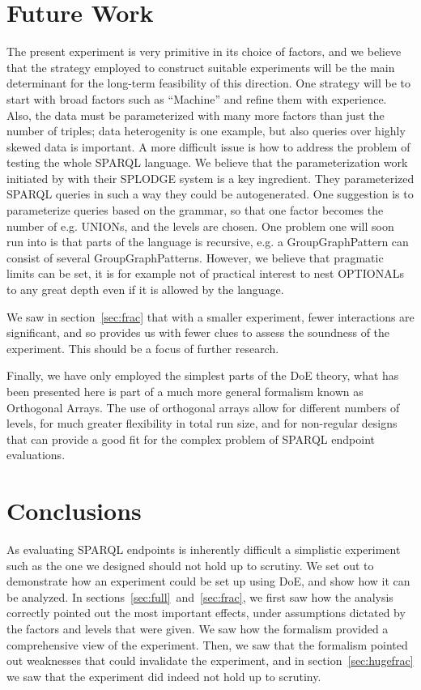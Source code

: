 \documentclass{llncs}
\begin{document}
\section{Future Work}

The present experiment is very primitive in its choice of factors, and
we believe that the strategy employed to construct suitable
experiments will be the main determinant for the long-term feasibility
of this direction. One strategy will be to start with broad factors
such as ``Machine'' and refine them with experience. Also, the data
must be parameterized with many more factors than just the number of
triples; data heterogenity \cite{Duan:2011:AOC:1989323.1989340} is one
example, but also queries over highly skewed data is important. A more
difficult issue is how to address the problem of testing the whole
SPARQL language\cite{sparql11query}. We believe that the
parameterization work initiated by \cite{goerlitz2012splodge} with
their SPLODGE system is a key ingredient. They parameterized SPARQL
queries in such a way they could be autogenerated. One suggestion is
to parameterize queries based on the grammar, so that one factor
becomes the number of e.g. UNIONs, and the levels are chosen. One
problem one will soon run into is that parts of the language is
recursive, e.g. a GroupGraphPattern can consist of several
GroupGraphPatterns. However, we believe that pragmatic limits can be
set, it is for example not of practical interest to nest OPTIONALs to
any great depth even if it is allowed by the language.

We saw in section~\ref{sec:frac} that with a smaller experiment, fewer
interactions are significant, and so provides us with fewer clues to
assess the soundness of the experiment. This should be a focus of
further research. 


Finally, we have only employed the simplest parts of the DoE
theory, what has been presented here is part of a much more general
formalism known as Orthogonal Arrays. The use of orthogonal arrays
allow for different numbers of levels, for much greater flexibility in
total run size, and for non-regular designs that can provide a good fit
for the complex problem of SPARQL endpoint evaluations. 

\section{Conclusions}

As evaluating SPARQL endpoints is inherently difficult a simplistic
experiment such as the one we designed should not hold up to
scrutiny. We set out to demonstrate how an experiment could be set up
using DoE, and show how it can be analyzed. In
sections~\ref{sec:full}~and~\ref{sec:frac}, we first saw how the
analysis correctly pointed out the most important effects, under
assumptions dictated by the factors and levels that were given. We saw
how the formalism provided a comprehensive view of the
experiment. Then, we saw that the formalism pointed out weaknesses
that could invalidate the experiment, and in
section~\ref{sec:hugefrac} we saw that the experiment did indeed not
hold up to scrutiny.
\end{document}
